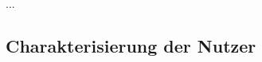 \documentclass[12pt]{article} %
\begin{document}



...

\subsection{Charakterisierung der Nutzer}






\end{document}
